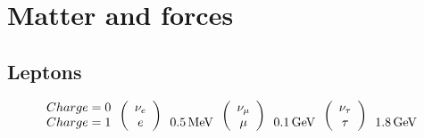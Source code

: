 
\chapter[Matter and forces]{Matter and forces}

\section{Leptons}

\[
  \begin{array}{ccccccc}
    \begin{array}{c}
    Charge = 0 \\
    Charge = 1
    \end{array}
    
  \left(
    \begin{array}{c}
    \nu_e \\
    e
    \end{array}
  \right)
  
    \begin{array}{c}
    \\
    0.5 \mathrm{\,MeV}
    \end{array}
  
  \left(
    \begin{array}{c}
    \nu_{\mu} \\
    \mu
    \end{array}
  \right)
  
    \begin{array}{c}
    \\
    0.1 \mathrm{\,GeV}
    \end{array}
  
  \left(
    \begin{array}{c}
    \nu_{\tau} \\
    \tau
    \end{array}
  \right)
  
    \begin{array}{c}
    \\
    1.8 \mathrm{\,GeV}
    \end{array}
  \end{array}
\]

